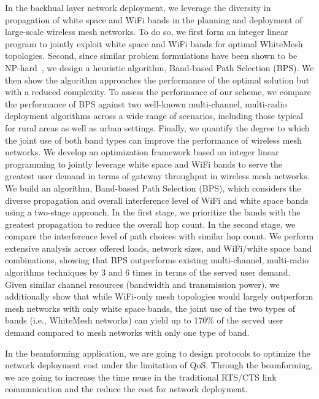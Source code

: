 In the backhual layer network deployment, we leverage the diversity in propagation of
white space and WiFi bands in the planning and deployment
of large-scale wireless mesh networks. To do so, we first form an
integer linear program to jointly exploit 
white space and WiFi bands for optimal WhiteMesh topologies.
Second, since similar problem formulations have been shown to be 
NP-hard~\cite{jain2005impact}, we design a heuristic algorithm, 
Band-based Path Selection (BPS). We then
show the algorithm approaches the performance of the 
optimal solution but with a reduced complexity. To assess the 
performance of our scheme, we compare the performance of 
BPS against two well-known multi-channel, multi-radio deployment 
algorithms across a wide range of scenarios, including those
typical for rural areas as well as urban settings. Finally, we
quantify the degree to which the joint use of both band types can improve the 
performance of wireless mesh networks.
We develop an optimization framework based on integer
linear programming to jointly leverage white space and WiFi bands
to serve the greatest user demand in terms of gateway throughput 
in wireless mesh networks.  
We build an algorithm, Band-based Path 
Selection (BPS), which considers the diverse propagation 
and overall interference level of WiFi and white space bands using
a two-stage approach.  In the first stage, we prioritize the bands
with the greatest propagation to reduce the overall hop count. In the
second stage, we compare the interference level of path choices with
similar hop count. 
We perform extensive analysis across offered loads,
network sizes, and WiFi/white space band combinations, showing that BPS outperforms existing
multi-channel, multi-radio algorithms techniques by 3 and 6 times
in terms of the served user demand.  
Given similar channel resources
(bandwidth and transmission power), we additionally show that while
WiFi-only mesh topologies would largely outperform mesh networks with only
white space bands, the joint use of the two types of bands (i.e., WhiteMesh 
networks) can yield up to 170\% of the served user demand compared to mesh networks
with only one type of band.



In the beamforming application, we are going to design protocols to 
optimize the network deployment cost under the limitation of QoS. Through
the beamforming, we are going to increase the time reuse in the traditional
RTS/CTS link communication and the reduce the cost for network deployment.
  


